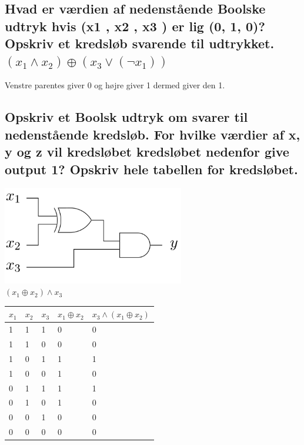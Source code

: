 \documentclass[12pt, a4paper]{article}
\begin{document}
					\subsection{Hvad er værdien af nedenstående Boolske udtryk hvis (x1 , x2 , x3 ) er lig (0, 1, 0)? Opskriv et kredsløb svarende til udtrykket. $(x_1\land x_2)\oplus (x_3\lor (\neg x_1))$}
						Venstre parentes giver 0 og højre giver 1 dermed giver den 1.\\
					\subsection{Opskriv et Boolsk udtryk om svarer til nedenstående kredsløb. For hvilke værdier af x, y og z vil kredsløbet kredsløbet nedenfor give output 1? Opskriv hele tabellen for kredsløbet.}
						\includegraphics[width=300px]{images/gates38.3.png}\\
						$(x_1\oplus x_2)\land x_3$\\
						\begin{table}[h!]
\begin{tabular}{|l|l|l|l|l|}
\hline
$x_1$ & $x_2$ & $x_3$ & $x_1\oplus x_2$ & $x_3\land( x_1\oplus x_2)$ \\ \hline
1    & 1    & 1    & 0                              & 0                                                        \\ \hline
1    & 1    & 0    & 0                              & 0                                                         \\ \hline
1    & 0    & 1    & 1                              & 1                                                         \\ \hline
1    & 0    & 0    & 1                              & 0                                                         \\ \hline
0    & 1    & 1    & 1                              & 1                                                         \\ \hline
0    & 1    & 0    & 1                              & 0                                                         \\ \hline
0    & 0    & 1    & 0                              & 0                                                         \\ \hline
0    & 0    & 0    & 0                              & 0                                                         \\ \hline
\end{tabular}
\end{table}	
\end{document}
